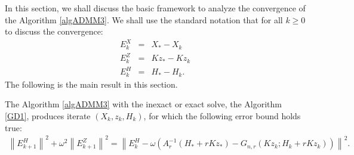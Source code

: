 In this section, we shall discuss the basic framework to analyze the convergence of the Algorithm \ref{algADMM3}. We shall use the standard notation that for all $k \geq 0$ to discuss the convergence:  
\begin{eqnarray*}
E_k^X &=& X_* - X_k \\
E_k^Z &=& Kz_* - Kz_k \\ 
E_k^H &=& H_* - H_k. 
\end{eqnarray*}
The following is the main result in this section. 
\begin{theorem}\label{main:theorem0} 
The Algorithm \ref{algADMM3} with the inexact or exact solve, the Algorithm \ref{GD1}, produces iterate $(X_k, z_k, H_k)$, for which the following error bound holds true: 
\begin{eqnarray*}
\left \|E_{k+1}^H \right \|^2 + \omega^2 \left \|E_{k+1}^Z \right \|^2 = \left \|E_k^H - \omega (A_r^{-1} (H_* + r K z_*) - G_{n,r} (Kz_k; H_k + r K z_k)) \right \|^2. 
\end{eqnarray*}
\end{theorem}

